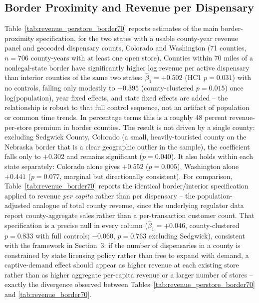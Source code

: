 \documentclass[12pt]{article}
\begin{document}
\subsection{Border Proximity and Revenue per Dispensary}
Table~\ref{tab:revenue_perstore_border70} reports estimates of the main border-proximity specification, for
the two states with a usable county-year revenue panel and geocoded dispensary counts, Colorado and
Washington (71 counties, $n=706$ county-years with at least one open store). Counties within 70 miles of a
nonlegal-state border have significantly higher log revenue per active dispensary than interior counties of
the same two states: $\hat\beta_1=+0.502$ (HC1 $p=0.031$) with no controls, falling only modestly to
$+0.395$ (county-clustered $p=0.015$) once log(population), year fixed effects, and state fixed effects are
added -- the relationship is robust to that full control sequence, not an artifact of population or common
time trends. In percentage terms this is a roughly 48 percent revenue-per-store premium in border counties.
The result is not driven by a single county: excluding Sedgwick County, Colorado (a small, heavily-touristed
county on the Nebraska border that is a clear geographic outlier in the sample), the coefficient falls only
to $+0.302$ and remains significant ($p=0.040$). It also holds within each state separately: Colorado alone
gives $+0.552$ ($p=0.005$), Washington alone $+0.441$ ($p=0.077$, marginal but directionally consistent).
For comparison, Table~\ref{tab:revenue_border70} reports the identical border/interior specification applied
to revenue \emph{per capita} rather than per dispensary -- the population-adjusted analogue of total county
revenue, since the underlying regulator data report county-aggregate sales rather than a per-transaction
customer count. That specification is a precise null in every column ($\hat\beta_1=+0.046$, county-clustered
$p=0.833$ with full controls; $-0.060$, $p=0.763$ excluding Sedgwick), consistent with the framework in
Section~3: if the number of dispensaries in a county is constrained by state licensing policy rather than
free to expand with demand, a captive-demand effect should appear as higher revenue at each existing store
rather than as higher aggregate per-capita revenue or a larger number of stores -- exactly the divergence
observed between Tables~\ref{tab:revenue_perstore_border70} and \ref{tab:revenue_border70}.




\end{document}
